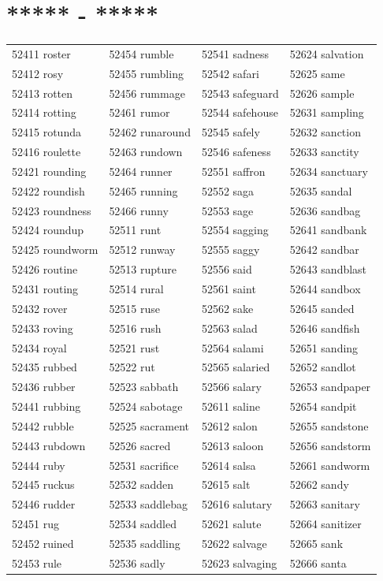 \documentclass[10pt, oneside]{book}
\begin{document}
\begin{table}[h]
	\centering
	\section*{***** - *****}
	\begin{tabular}{l l l l}
52411 roster &52454 rumble &52541 sadness &52624 salvation\\
52412 rosy &52455 rumbling &52542 safari &52625 same\\
52413 rotten &52456 rummage &52543 safeguard &52626 sample\\
52414 rotting &52461 rumor &52544 safehouse &52631 sampling\\
52415 rotunda &52462 runaround &52545 safely &52632 sanction\\
52416 roulette &52463 rundown &52546 safeness &52633 sanctity\\
52421 rounding &52464 runner &52551 saffron &52634 sanctuary\\
52422 roundish &52465 running &52552 saga &52635 sandal\\
52423 roundness &52466 runny &52553 sage &52636 sandbag\\
52424 roundup &52511 runt &52554 sagging &52641 sandbank\\
52425 roundworm &52512 runway &52555 saggy &52642 sandbar\\
52426 routine &52513 rupture &52556 said &52643 sandblast\\
52431 routing &52514 rural &52561 saint &52644 sandbox\\
52432 rover &52515 ruse &52562 sake &52645 sanded\\
52433 roving &52516 rush &52563 salad &52646 sandfish\\
52434 royal &52521 rust &52564 salami &52651 sanding\\
52435 rubbed &52522 rut &52565 salaried &52652 sandlot\\
52436 rubber &52523 sabbath &52566 salary &52653 sandpaper\\
52441 rubbing &52524 sabotage &52611 saline &52654 sandpit\\
52442 rubble &52525 sacrament &52612 salon &52655 sandstone\\
52443 rubdown &52526 sacred &52613 saloon &52656 sandstorm\\
52444 ruby &52531 sacrifice &52614 salsa &52661 sandworm\\
52445 ruckus &52532 sadden &52615 salt &52662 sandy\\
52446 rudder &52533 saddlebag &52616 salutary &52663 sanitary\\
52451 rug &52534 saddled &52621 salute &52664 sanitizer\\
52452 ruined &52535 saddling &52622 salvage &52665 sank\\
52453 rule &52536 sadly &52623 salvaging &52666 santa\\
	\end{tabular}
 \end{table}
\end{document}
